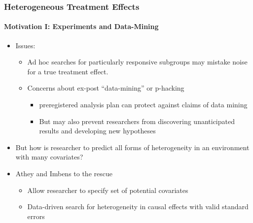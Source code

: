 \documentclass[
  shownotes,
  xcolor={svgnames},
  hyperref={colorlinks,citecolor=DarkBlue,linkcolor=DarkRed,urlcolor=DarkBlue}
  , aspectratio=169]{beamer}
\begin{document}
\begin{frame}[fragile]
\frametitle{Heterogeneous Treatment Effects}

\framesubtitle{Motivation I: Experiments and Data-Mining}

\begin{itemize}
  \item Issues:
  
  \begin{itemize}
  \item Ad hoc searches for particularly responsive subgroups may mistake noise for a true treatment effect. 
  
  \item Concerns about ex-post “data-mining” or  p-hacking
    \begin{itemize}
      \item preregistered analysis plan can protect against claims of data mining  
      \item But may also prevent researchers from discovering unanticipated results and developing new hypotheses
    \end{itemize}
  \end{itemize}
\medskip
\item But how is researcher to predict all forms of heterogeneity in an environment with many covariates?
\medskip
\item Athey and Imbens to the rescue
\begin{itemize}
  \item Allow researcher to specify set of potential covariates
  \item Data-driven search for heterogeneity in causal effects with valid standard errors
\end{itemize}


\end{itemize}


\end{frame}
\end{document}
